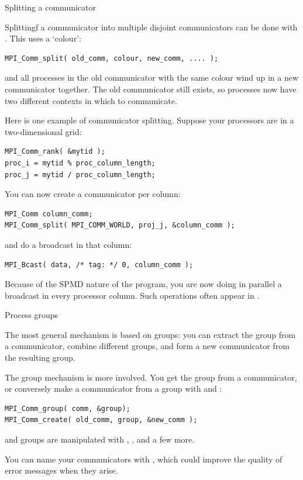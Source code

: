  {Splitting a communicator}

Splittingf a communicator into multiple disjoint communicators
can be done with .
This uses a `colour':
\begin{verbatim}
MPI_Comm_split( old_comm, colour, new_comm, .... );
\end{verbatim}
  and all processes in the old communicator with the same colour
  wind up in a new communicator together. The old communicator still exists,
  so processes now have two different contexts in which to communicate.

Here is one example of communicator splitting. Suppose your processors
are in a two-dimensional grid:
\begin{verbatim}
MPI_Comm_rank( &mytid );
proc_i = mytid % proc_column_length;
proc_j = mytid / proc_column_length;
\end{verbatim}
You can now create a communicator per column:
\begin{verbatim}
MPI_Comm column_comm;
MPI_Comm_split( MPI_COMM_WORLD, proj_j, &column_comm );
\end{verbatim}
and do a broadcast in that column:
\begin{verbatim}
MPI_Bcast( data, /* tag: */ 0, column_comm );
\end{verbatim}
Because of the SPMD nature of the program, you are now doing in parallel
a broadcast in every processor column. Such operations often appear
in .

 {Process groups}

The most general mechanism is based on groups: you can extract the
group from a communicator, combine different groups, and form a new
communicator from the resulting group.

The group mechanism is more involved. You get the group from a
communicator, or conversely make a communicator from a group with
 and :
\begin{verbatim}
MPI_Comm_group( comm, &group);
MPI_Comm_create( old_comm, group, &new_comm );
\end{verbatim}
and groups are manipulated with
, ,
 and a few more.

You can name your communicators with , which
could improve the quality of error messages when they arise.

